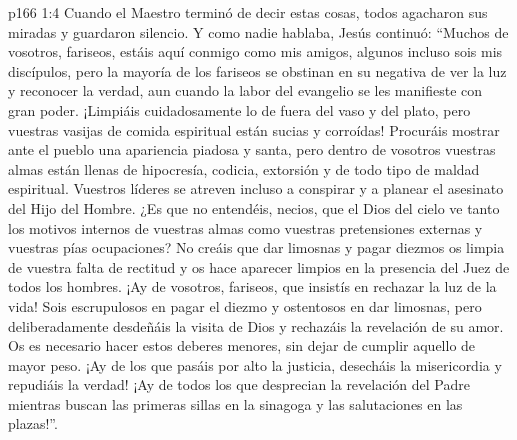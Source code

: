 \vs p166 1:4 Cuando el Maestro terminó de decir estas cosas, todos agacharon sus miradas y guardaron silencio. Y como nadie hablaba, Jesús continuó: “Muchos de vosotros, fariseos, estáis aquí conmigo como mis amigos, algunos incluso sois mis discípulos, pero la mayoría de los fariseos se obstinan en su negativa de ver la luz y reconocer la verdad, aun cuando la labor del evangelio se les manifieste con gran poder. ¡Limpiáis cuidadosamente lo de fuera del vaso y del plato, pero vuestras vasijas de comida espiritual están sucias y corroídas! Procuráis mostrar ante el pueblo una apariencia piadosa y santa, pero dentro de vosotros vuestras almas están llenas de hipocresía, codicia, extorsión y de todo tipo de maldad espiritual. Vuestros líderes se atreven incluso a conspirar y a planear el asesinato del Hijo del Hombre. ¿Es que no entendéis, necios, que el Dios del cielo ve tanto los motivos internos de vuestras almas como vuestras pretensiones externas y vuestras pías ocupaciones? No creáis que dar limosnas y pagar diezmos os limpia de vuestra falta de rectitud y os hace aparecer limpios en la presencia del Juez de todos los hombres. ¡Ay de vosotros, fariseos, que insistís en rechazar la luz de la vida! Sois escrupulosos en pagar el diezmo y ostentosos en dar limosnas, pero deliberadamente desdeñáis la visita de Dios y rechazáis la revelación de su amor. Os es necesario hacer estos deberes menores, sin dejar de cumplir aquello de mayor peso. ¡Ay de los que pasáis por alto la justicia, desecháis la misericordia y repudiáis la verdad! ¡Ay de todos los que desprecian la revelación del Padre mientras buscan las primeras sillas en la sinagoga y las salutaciones en las plazas!”.
